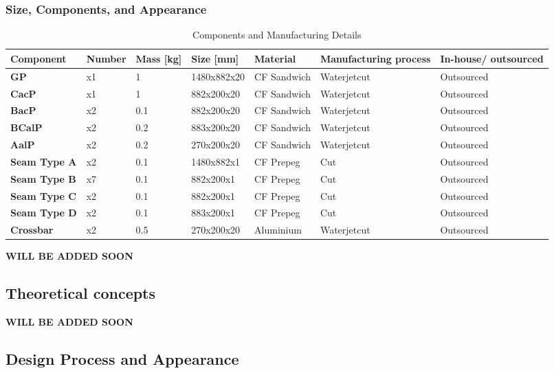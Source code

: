 \subsubsection{Size, Components, and Appearance}
\begin{table}[ht]
\centering

\label{table:components}
\begin{adjustbox}{width=\textwidth,center}
\begin{tabular}{|>{\bfseries}m{2.5cm}|m{1.4cm}|m{1.7cm}|m{2.1cm}|m{2.2cm}|m{2.6cm}|m{2.2cm}|}
\hline
Component & Number & Mass [kg] & Size [mm] & Material & Manufacturing process & In-house/ outsourced \\
\hline
GP & x1 & 1 & 1480x882x20 & CF Sandwich & Waterjetcut & Outsourced \\
CacP & x1 & 1 & 882x200x20 & CF Sandwich & Waterjetcut & Outsourced \\
BacP & x2 & 0.1 & 882x200x20 & CF Sandwich & Waterjetcut & Outsourced \\
BCalP & x2 & 0.2 & 883x200x20 & CF Sandwich & Waterjetcut & Outsourced \\
AalP & x2 & 0.2 & 270x200x20 & CF Sandwich & Waterjetcut & Outsourced \\
Seam Type A & x2 & 0.1 & 1480x882x1 & CF Prepeg & Cut & Outsourced \\
Seam Type B & x7 & 0.1 & 882x200x1 & CF Prepeg & Cut & Outsourced \\
Seam Type C & x2 & 0.1 & 882x200x1 & CF Prepeg & Cut & Outsourced \\
Seam Type D & x2 & 0.1 & 883x200x1 & CF Prepeg & Cut & Outsourced \\
Crossbar & x2 & 0.5 & 270x200x20 & Aluminium & Waterjetcut & Outsourced \\
\hline

\end{tabular}
\end{adjustbox}
\caption{Components and Manufacturing Details}
\end{table}
\textbf{WILL BE ADDED SOON}

\subsection{Theoretical concepts}
\textbf{WILL BE ADDED SOON}


\subsection{Design Process and Appearance}
